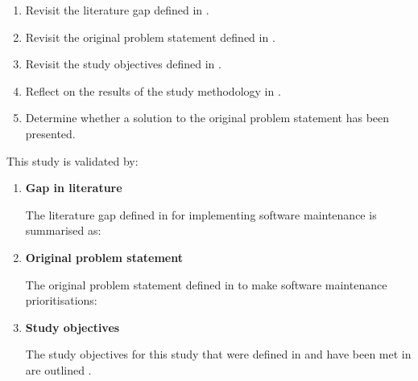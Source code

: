 \begin{enumerate}[label=\textbf{\Roman*.}]
	\item Revisit the literature gap defined in .
	\item Revisit the original problem statement defined in .
	\item Revisit the study objectives defined in .
	\item Reflect on the results of the study methodology in .
	\item Determine whether a solution to the original problem statement has been presented. 
\end{enumerate}

This study is validated by:

\begin{enumerate}[label=\textbf{\Roman*.}]
	\item \textbf{Gap in literature} \par The literature gap defined in  for implementing software maintenance is summarised as: 
		\begin{center}
			\begin{tcolorbox}[colback=lightgray, colframe=black, sharp corners=all, arc=4pt]
				\begin{minipage}{\textwidth}
					\RaggedRight\textit{\studyGap}
				\end{minipage}
			\end{tcolorbox}
		\end{center}

	\item \textbf{Original problem statement} \par The original problem statement defined in  to make software maintenance prioritisations:
		\begin{center}
			\begin{tcolorbox}[colback=lightgray, colframe=black, sharp corners=all, arc=4pt]
				\begin{minipage}{\textwidth}
					\RaggedRight\textit{\problemStatement}
				\end{minipage}
			\end{tcolorbox}
		\end{center}

	\item \textbf{Study objectives} \par The study objectives for this study that were defined in  and have been met in are outlined . 


\end{enumerate}
